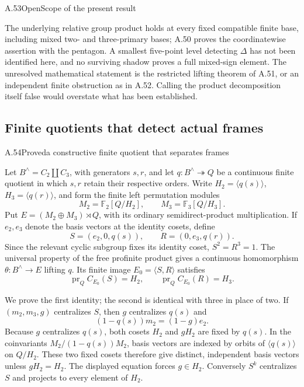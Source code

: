 \begin{statement}{A.53}{Open}{Scope of the present result}
\end{statement}
The underlying relative group product holds at every fixed
compatible finite base, including mixed two- and three-primary
bases; A.50 proves the coordinatewise assertion with the
pentagon. A smallest five-point level detecting $\Delta$ has
not been identified here, and no surviving shadow proves a
full mixed-sign element. The unresolved mathematical statement
is the restricted lifting theorem of A.51, or an independent
finite obstruction as in A.52. Calling the product decomposition
itself false would overstate what has been established.

\subsection{Finite quotients that detect actual frames}


\begin{statement}{A.54}{Proved}{a constructive finite quotient that separates frames}
\end{statement}
Let $B^\wedge=C_2\amalg C_3$, with generators $s,r$, and let
$q:B^\wedge\twoheadrightarrow Q$ be a continuous finite quotient in which
$s,r$ retain their respective orders. Write $H_2=\langle q(s)\rangle$,
$H_3=\langle q(r)\rangle$, and form the finite left permutation modules
\[
 M_2=\mathbb F_2[Q/H_2],\qquad M_3=\mathbb F_3[Q/H_3].
\]
Put $E=(M_2\oplus M_3)\rtimes Q$, with its ordinary semidirect-product
multiplication. If $e_2,e_3$ denote the basis vectors at the identity
cosets, define
\[
 S=(e_2,0,q(s)),\qquad R=(0,e_3,q(r)).
\]
Since the relevant cyclic subgroup fixes its identity coset, $S^2=R^3=1$.
The universal property of the free profinite product gives a continuous
homomorphism $\theta:B^\wedge\to E$ lifting $q$. Its finite image
$E_0=\langle S,R\rangle$ satisfies
\[
 \operatorname{pr}_Q C_{E_0}(S)=H_2,\qquad
 \operatorname{pr}_Q C_{E_0}(R)=H_3.
\]

We prove the first identity; the second is identical with three in place
of two. If $(m_2,m_3,g)$ centralizes $S$, then $g$ centralizes $q(s)$ and
\[
 (1-q(s))m_2=(1-g)e_2.
\]
Because $g$ centralizes $q(s)$, both cosets $H_2$ and $gH_2$ are fixed by
$q(s)$. In the coinvariants $M_2/(1-q(s))M_2$, basis vectors are indexed
by orbits of $\langle q(s)\rangle$ on $Q/H_2$. These two fixed cosets
therefore give distinct, independent basis vectors unless $gH_2=H_2$.
The displayed equation forces $g\in H_2$. Conversely $S^k$ centralizes
$S$ and projects to every element of $H_2$.

